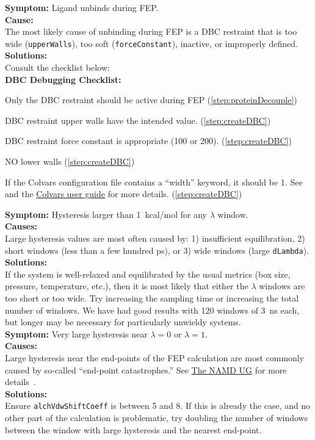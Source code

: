 \documentclass[9pt,tutorial]{Styling/livecoms}
\newcommand{\textInput}[1]{\texttt{#1}}
\begin{document}
\noindent\textbf{Symptom:} Ligand unbinds during FEP.\\
\textbf{Cause:}\\
The most likely cause of unbinding during FEP is a DBC restraint that is too wide (\textInput{upperWalls}), too soft (\textInput{forceConstant}), inactive, or improperly defined.\\
\textbf{Solutions:}\\
 Consult the checklist below:\\

\textbf{DBC Debugging Checklist:}
\label{list:DBCdebug}
\begin{todolist} 
    \item Only the DBC restraint should be active during FEP (\ref{step:proteinDecouple})
    \item DBC restraint upper walls have the intended value. (\ref{step:createDBC})
    \item DBC restraint force constant is appropriate (100 or 200). (\ref{step:createDBC})
    \item NO lower walls (\ref{step:createDBC})
    \item If the Colvars configuration file contains a ``width'' keyword, it should be 1. See~\cite{Fiorin2013} and the \href{http://colvars.github.io/colvars-refman-vmd/colvars-refman-vmd.html#sec:colvar_grid_params}{Colvars user guide} for more details. (\ref{step:createDBC})
\end{todolist}


\noindent\textbf{Symptom:} Hysteresis larger than 1~kcal/mol for any $\lambda$ window.\\
\textbf{Causes:}\\
Large hysteresis values are most often caused by: 1) insufficient equilibration, 2) short windows (less than a few hundred ps), or 3) wide windows (large \textInput{dLambda}).\\
\textbf{Solutions:}\\
If the system is well-relaxed and equilibrated by the usual metrics (box size, pressure, temperature, etc.), then it is most likely that either the $\lambda$ windows are too short or too wide. Try increasing the sampling time or increasing the total number of windows. We have had good results with 120 windows of 3~ns each, but longer may be necessary for particularly unwieldy systems.\\

\noindent\textbf{Symptom:}  Very large hysteresis near $\lambda=0$ or $\lambda=1$.\\
\textbf{Causes:}\\
Large hysteresis near the end-points of the FEP calculation are most commonly caused by so-called ``end-point catastrophes.'' See \href{https://www.ks.uiuc.edu/Research/namd/2.14/ug/node63.html}{The NAMD UG} for more details~\cite{Bernardi2020}.\\  
\textbf{Solutions:}\\
Ensure \textInput{alchVdwShiftCoeff} is between 5 and 8. If this is already the case, and no other part of the calculation is problematic, try doubling the number of windows between the window with large hysteresis and the nearest end-point.\\
\end{document}
